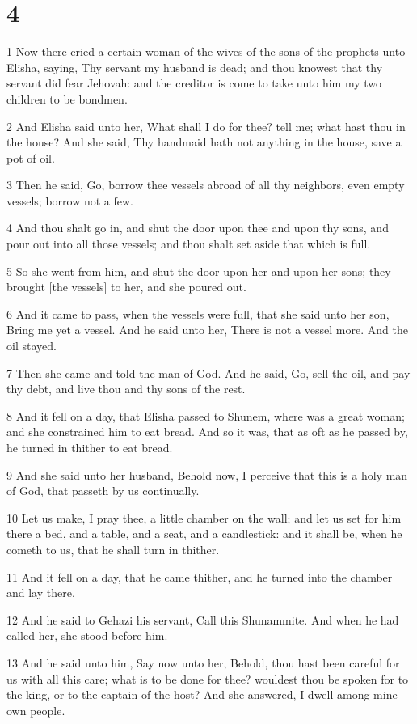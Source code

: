 \chapter{4}

\par 1 Now there cried a certain woman of the wives of the sons of the prophets unto Elisha, saying, Thy servant my husband is dead; and thou knowest that thy servant did fear Jehovah: and the creditor is come to take unto him my two children to be bondmen.
\par 2 And Elisha said unto her, What shall I do for thee? tell me; what hast thou in the house? And she said, Thy handmaid hath not anything in the house, save a pot of oil.
\par 3 Then he said, Go, borrow thee vessels abroad of all thy neighbors, even empty vessels; borrow not a few.
\par 4 And thou shalt go in, and shut the door upon thee and upon thy sons, and pour out into all those vessels; and thou shalt set aside that which is full.
\par 5 So she went from him, and shut the door upon her and upon her sons; they brought [the vessels] to her, and she poured out.
\par 6 And it came to pass, when the vessels were full, that she said unto her son, Bring me yet a vessel. And he said unto her, There is not a vessel more. And the oil stayed.
\par 7 Then she came and told the man of God. And he said, Go, sell the oil, and pay thy debt, and live thou and thy sons of the rest.
\par 8 And it fell on a day, that Elisha passed to Shunem, where was a great woman; and she constrained him to eat bread. And so it was, that as oft as he passed by, he turned in thither to eat bread.
\par 9 And she said unto her husband, Behold now, I perceive that this is a holy man of God, that passeth by us continually.
\par 10 Let us make, I pray thee, a little chamber on the wall; and let us set for him there a bed, and a table, and a seat, and a candlestick: and it shall be, when he cometh to us, that he shall turn in thither.
\par 11 And it fell on a day, that he came thither, and he turned into the chamber and lay there.
\par 12 And he said to Gehazi his servant, Call this Shunammite. And when he had called her, she stood before him.
\par 13 And he said unto him, Say now unto her, Behold, thou hast been careful for us with all this care; what is to be done for thee? wouldest thou be spoken for to the king, or to the captain of the host? And she answered, I dwell among mine own people.
